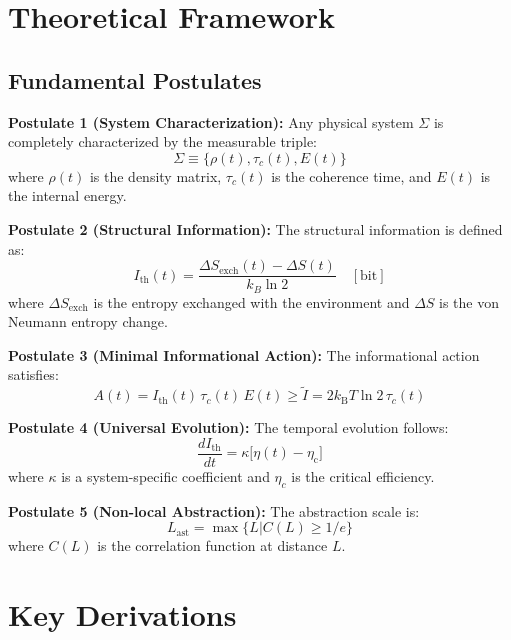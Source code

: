 \documentclass[twocolumn,10pt]{IEEEtran}
\begin{document}
\section{Theoretical Framework}

\subsection{Fundamental Postulates}

\textbf{Postulate 1 (System Characterization):} Any physical system $\Sigma$ is completely characterized by the measurable triple:
\begin{equation}
\Sigma \equiv \{\rho(t), \tau_c(t), E(t)\}
\end{equation}
where $\rho(t)$ is the density matrix, $\tau_c(t)$ is the coherence time, and $E(t)$ is the internal energy.

\textbf{Postulate 2 (Structural Information):} The structural information is defined as:
\begin{equation}
I_{\text{th}}(t) = \frac{\Delta S_{\text{exch}}(t) - \Delta S(t)}{k_B \ln 2} \quad [\text{bit}]
\end{equation}
where $\Delta S_{\text{exch}}$ is the entropy exchanged with the environment and $\Delta S$ is the von Neumann entropy change.

\textbf{Postulate 3 (Minimal Informational Action):} The informational action satisfies:
\begin{equation}
A(t) = I_{\text{th}}(t)\,\tau_c(t)\,E(t) \geq \tilde{I} = 2k_{\text{B}}T\ln 2\,\tau_c(t)
\end{equation}

\textbf{Postulate 4 (Universal Evolution):} The temporal evolution follows:
\begin{equation}
\frac{dI_{\text{th}}}{dt}=\kappa\!\bigl[\eta(t)-\eta_{\text{c}}\bigr]
\end{equation}
where $\kappa$ is a system-specific coefficient and $\eta_c$ is the critical efficiency.

\textbf{Postulate 5 (Non-local Abstraction):} The abstraction scale is:
\begin{equation}
L_{\text{ast}} = \max\{L | C(L) \geq 1/e\}
\end{equation}
where $C(L)$ is the correlation function at distance $L$.

\section{Key Derivations}
\end{document}
